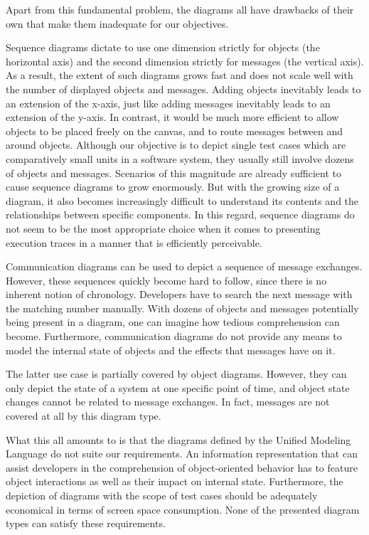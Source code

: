 Apart from this fundamental problem, the diagrams all have drawbacks of their own that make them inadequate for our objectives.

Sequence diagrams dictate to use one dimension strictly for objects (the horizontal axis) and the second dimension strictly for messages (the vertical axis).
As a result, the extent of such diagrams grows fast and does not scale well with the number of displayed objects and messages.
Adding objects inevitably leads to an extension of the x-axis, just like adding messages inevitably leads to an extension of the y-axis.
In contrast, it would be much more efficient to allow objects to be placed freely on the canvas, and to route messages between and around objects.
Although our objective is to depict single test cases which are comparatively small units in a software system, they usually still involve dozens of objects and messages.
Scenarios of this magnitude are already sufficient to cause sequence diagrams to grow enormously.
But with the growing size of a diagram, it also becomes increasingly difficult to understand its contents and the relationships between specific components.
In this regard, sequence diagrams do not seem to be the most appropriate choice when it comes to presenting execution traces in a manner that is efficiently perceivable.

Communication diagrams can be used to depict a sequence of message exchanges.
However, these sequences quickly become hard to follow, since there is no inherent notion of chronology.
Developers have to search the next message with the matching number manually.
With dozens of objects and messages potentially being present in a diagram, one can imagine how tedious comprehension can become.
Furthermore, communication diagrams do not provide any means to model the internal state of objects and the effects that messages have on it.

The latter use case is partially covered by object diagrams.
However, they can only depict the state of a system at one specific point of time, and
object state changes cannot be related to message exchanges.
In fact, messages are not covered at all by this diagram type.

What this all amounts to is that the diagrams defined by the Unified Modeling Language do not suite our requirements.
An information representation that can assist developers in the comprehension of object-oriented behavior has to feature object interactions as well as their impact on internal state.
Furthermore, the depiction of diagrams with the scope of test cases should be adequately economical in terms of screen space consumption.
None of the presented diagram types can satisfy these requirements.